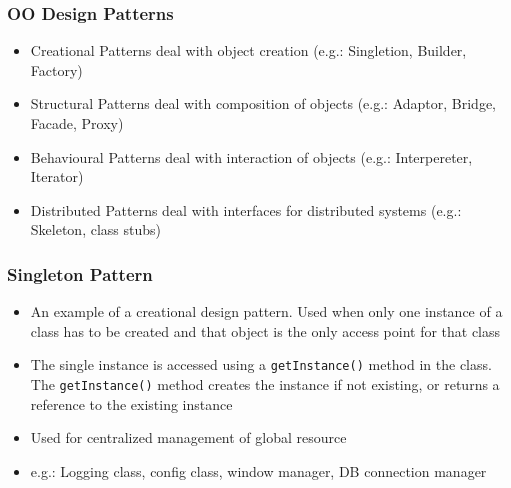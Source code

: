 \documentclass{article}
\begin{document}
\subsubsection{OO Design Patterns}
\begin{itemize}
    \item Creational Patterns deal with object creation (e.g.: Singletion, Builder, Factory)
    
    \item Structural Patterns deal with composition of objects (e.g.: Adaptor, Bridge, Facade, Proxy)
    
    \item Behavioural Patterns deal with interaction of objects (e.g.: Interpereter, Iterator)
    
    \item Distributed Patterns deal with interfaces for distributed systems (e.g.: Skeleton, class stubs)
\end{itemize}

\subsubsection{Singleton Pattern}
\begin{itemize}
    \item An example of a creational design pattern. Used when only one instance of a class has to be created and that object is the only access point for that class
    
    \item The single instance is accessed using a \texttt{getInstance()} method in the class. The \texttt{getInstance()} method creates the instance if not existing, or returns a reference to the existing instance
    
    \item Used for centralized management of global resource
    
    \item e.g.: Logging class, config class, window manager, DB connection manager
\end{itemize}
\end{document}
